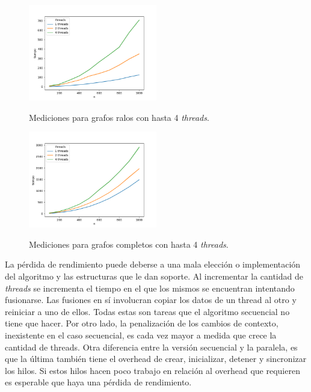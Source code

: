 \begin{figure}[h]
\caption{Mediciones para grafos ralos con hasta 4 \textit{threads}.}
\centering
\includegraphics[width=0.5\textwidth]{imagenes/ralo-124.png} \\%
\label{fig:ralos124}
\end{figure}

\begin{figure}[h]
\caption{Mediciones para grafos completos con hasta 4 \textit{threads}.}
\centering
\includegraphics[width=0.5\textwidth]{imagenes/completo-124.png} \\%
\label{fig:completos124}
\end{figure}

La pérdida de rendimiento puede deberse a una mala elección o implementación
del algoritmo y las estructuras que le dan soporte. Al incrementar la 
cantidad de \textit{threads} se incrementa el tiempo en el que los mismos se
 encuentran intentando fusionarse. Las fusiones en sí involucran copiar los 
 datos de un thread al otro y reiniciar a uno de ellos. Todas estas son tareas 
 que el algoritmo secuencial no tiene que hacer. Por otro lado, la penalización
  de los cambios de contexto, inexistente en el caso secuencial, es cada vez 
  mayor a medida que crece la cantidad de threads.
  Otra diferencia entre la versión secuencial y la paralela, es que la última 
  también tiene el overhead de crear, inicializar, detener y sincronizar los 
  hilos. Si estos hilos hacen poco trabajo en relación al overhead que 
  requieren es esperable que haya una pérdida de rendimiento.
